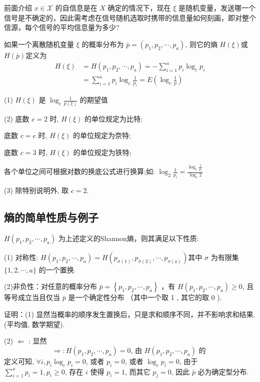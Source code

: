 前面介绍 $ x \in \mathscr{X} $ 的自信息是在 $ X $ 确定的情况下，现在 $ \xi $ 是随机变量，发送哪一个信号是不确定的，因此需考虑在信号随机选取时携带的信息量如何刻画，即对整个信源，每个信号的平均信息量为多少?

\begin{definition}
   如果一个离散随机变量 $ \xi $ 的概率分布为 $\bar{p}=\left(p_{1}, p_{2}, \cdots, p_{a}\right)$, 则它的熵 $H(\xi)$或  $H(\bar{p})$定义为 
$$
\begin{aligned}
H(\xi)&=H\left(p_{1}, p_{2}, \cdots, p_{a}\right)=-\sum_{i=1}^{a} p_{i} \log _{c} p_{i} \\
&=\sum_{i=1}^{a} p_{i} \log _{c} \frac{1}{p_{i}}=E\left(\log _{c} \frac{1}{p}\right)
\end{aligned}
$$ 
\end{definition}
\begin{remark}

(1) $ H(\xi) $ 是 $ \log _{c} \frac{1}{p(\xi)} $ 的期望值

(2) 底数 $ c=2 $ 时, $ H(\xi) $ 的单位规定为比特;

底数 $ c=e $ 时, $ H(\xi) $ 的单位规定为奈特;

底数 $ c=3 $ 时, $ H(\xi) $ 的单位规定为铁特;

各个单位之间可根据对数的换底公式进行换算;如: $ \log _{2} \frac{1}{p_{i}}=\frac{\log _{e} \frac{1}{p_{i}}}{\log _{e} 2} $

(3) 除特别说明外, 取 $ c=2 $.
\end{remark}

\subsection{熵的简单性质与例子}

 $ H\left(p_{1}, p_{2}, \cdots, p_{a}\right) $ 为上述定义的Shannon熵，则其满足以下性质:
 
(1) 对称性: $ H\left(p_{1}, p_{2}, \cdots, p_{a}\right)=H\left(p_{\sigma(1)}, p_{\sigma(2)}, \cdots, p_{\sigma(a)}\right) $其中 $ \sigma $ 为有限集 $ \{1,2, \cdots, a\} $ 的一个置换.

(2)非负性：对任意的概率分布 $ \bar{p}=\left\{p_{1}, p_{2}, \cdots, p_{a}\right\} $ ，有 $ H\left(p_{1}, p_{2}, \cdots, p_{a}\right) \geqslant 0 $, 且等号成立当且仅当 $ \bar{p} $ 是一个确定性分布 （其中一个取 1 , 其它的取 0 ).

证明：(1) 显然当概率的顺序发生置换后，只是求和顺序不同，并不影响求和结果. (平均值, 数学期望).

(2) $ \Leftarrow $ : 显然
$$
\Rightarrow: H\left(p_{1}, p_{2}, \cdots, p_{a}\right)=0 \text {, 由 } H\left(p_{1}, p_{2}, \cdots, p_{a}\right) \text { 的 }
$$
定义可知, $ \forall i, p_{i} \log _{c} p_{i}=0 $, 或者 $ p_{i}=0 $, 或者 $ \log _{c} p_{i}=0 $, 由于 $ \sum\limits_{i=1}^{a} p_{i}=1, p_{i} \geq 0 $, 存在 $ i $ 使得 $ p_{i}=1 $, 而其它 $ p_{j}=0 $, 因此 $ \bar{p} $ 必为确定型分布.


